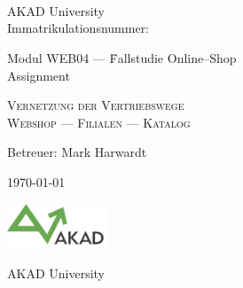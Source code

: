 

\begin{titlepage}


\vspace{5cm}

\Name \\ 
\Strasse \\ 
\PlzOrt\\ 
\href{mailto:\Email}{\Email}

AKAD University\\
Immatrikulationsnummer: \Immatrikulationsnummer

\vfill

\begin{tabbing}
Modul WEB04 --- \=Fallstudie Online--Shop\\ 
                \>Assignment  
\end{tabbing}
\LARGE
\textsc{Vernetzung der Vertriebswege\\Webshop --- Filialen --- Katalog}\\

\vfill

\normalsize

Betreuer: Mark Harwardt

\today %

\vfill

\includegraphics[width=3cm]{akad_logo.png}

AKAD University

\end{titlepage}



\normalsize
